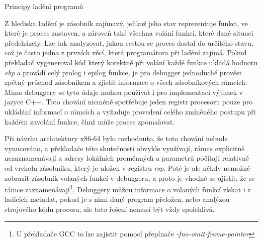 \documentclass[bc,male,python,dept460]{diploma}						%
\newcommand{\parspace}[1][]{
	\ifthenelse{\isempty{#1}}{\vspace{5mm}}{\vspace{#1}}
	\par
}
\begin{document}
\begin{section}{Principy ladění programů}
		\parspace Z hlediska ladění je zásobník zajímavý, jelikož jeho stav reprezentuje funkci, ve které je proces zastaven, a zároveň také všechna volání
		funkcí, které dané situaci předcházely. Lze tak analyzovat, jakou cestou se proces dostal do určitého stavu, což je často jedna z prvních věcí, která
		programátora při ladění zajímá. Pokud překladač vygeneroval kód který korektně při volání každé funkce ukládá hodnotu \textit{ebp} a provádí
		celý prolog i epilog funkce, je pro debugger jednoduché provést zpětný průchod zásobníkem a zjistit informace o všech zásobníkových rámcích.
		Mimo debuggery se tyto údaje mohou používat i pro implementaci výjimek v jazyce C++.
		Toto chování nicméně spotřebuje jeden registr procesoru pouze pro ukládání informací o rámcích a vyžaduje provedení celého zmíněného postupu při každém
		zavolání funkce, čímž může proces zpomalovat.
		
		\parspace Při návrhu architektury x86-64 bylo rozhodnuto, že toto chování nebude vynucováno\cite[16]{x64abi}, a překladače této skutečnosti
		obvykle využívají, rámce explicitně nezaznamenávají a adresy lokálních proměnných a parametrů počítají relativně od vrcholu zásobníku,
		který je uložen v registru \textit{rsp}. Poté je ale někdy nemožné zobrazit zásobník volaných funkcí v debuggeru, a proto je vhodné se ujistit,
		že se rámce zaznamenávají\footnote{U překladače GCC to lze zajistit pomocí přepínače \textit{-fno-omit-frame-pointer}}. Debuggery můžou
		informace o volaných funkcí získat i z ladících metadat, pokud je s nimi daný program přeložen, nebo analýzou strojového kódu procesu, ale tato řešení
		nemusí být vždy spolehlivá.
		
\end{section}
\end{document}

